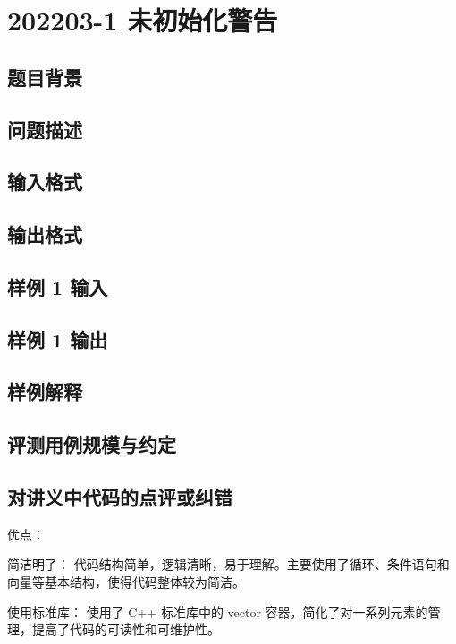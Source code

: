 \section{202203-1 未初始化警告}

\subsection{题目背景}

\subsection{问题描述}

\subsection{输入格式}

\subsection{输出格式}

\subsection{样例 1 输入}

\subsection{样例 1 输出}

\subsection{样例解释}

\subsection{评测用例规模与约定}

\subsection{对讲义中代码的点评或纠错}
 
优点：

简洁明了： 代码结构简单，逻辑清晰，易于理解。主要使用了循环、条件语句和向量等基本结构，使得代码整体较为简洁。

使用标准库： 使用了 C++ 标准库中的 vector 容器，简化了对一系列元素的管理，提高了代码的可读性和可维护性。

